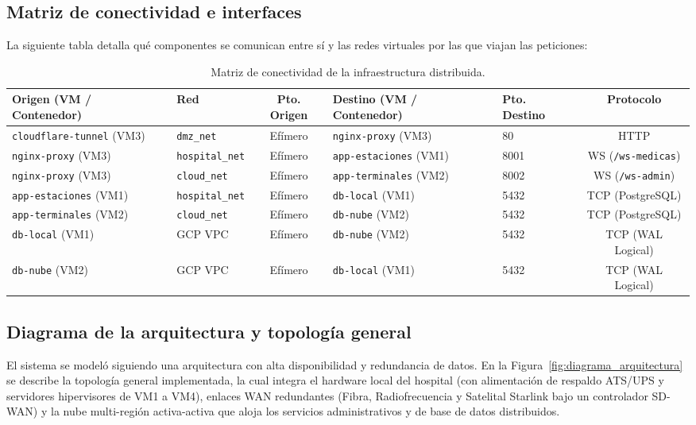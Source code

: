 \documentclass[11pt,a4paper]{article}
\begin{document}
\subsection{Matriz de conectividad e interfaces}
La siguiente tabla detalla qué componentes se comunican entre sí y las redes virtuales por las que viajan las peticiones:

\begin{table}[h!]
\centering
\small
\begin{tabular}{llcllc}
\toprule
\textbf{Origen (VM / Contenedor)} & \textbf{Red} & \textbf{Pto. Origen} & \textbf{Destino (VM / Contenedor)} & \textbf{Pto. Destino} & \textbf{Protocolo} \\
\midrule
\texttt{cloudflare-tunnel} (VM3) & \texttt{dmz\_net} & Efímero & \texttt{nginx-proxy} (VM3) & 80 & HTTP \\
\texttt{nginx-proxy} (VM3) & \texttt{hospital\_net} & Efímero & \texttt{app-estaciones} (VM1) & 8001 & WS (\texttt{/ws-medicas}) \\
\texttt{nginx-proxy} (VM3) & \texttt{cloud\_net} & Efímero & \texttt{app-terminales} (VM2) & 8002 & WS (\texttt{/ws-admin}) \\
\texttt{app-estaciones} (VM1) & \texttt{hospital\_net} & Efímero & \texttt{db-local} (VM1) & 5432 & TCP (PostgreSQL) \\
\texttt{app-terminales} (VM2) & \texttt{cloud\_net} & Efímero & \texttt{db-nube} (VM2) & 5432 & TCP (PostgreSQL) \\
\texttt{db-local} (VM1) & GCP VPC & Efímero & \texttt{db-nube} (VM2) & 5432 & TCP (WAL Logical) \\
\texttt{db-nube} (VM2) & GCP VPC & Efímero & \texttt{db-local} (VM1) & 5432 & TCP (WAL Logical) \\
\bottomrule
\end{tabular}
\caption{Matriz de conectividad de la infraestructura distribuida.}
\label{tab:conectividad}
\end{table}

\subsection{Diagrama de la arquitectura y topología general}
El sistema se modeló siguiendo una arquitectura con alta disponibilidad y redundancia de datos. En la Figura~\ref{fig:diagrama_arquitectura} se describe la topología general implementada, la cual integra el hardware local del hospital (con alimentación de respaldo ATS/UPS y servidores hipervisores de VM1 a VM4), enlaces WAN redundantes (Fibra, Radiofrecuencia y Satelital Starlink bajo un controlador SD-WAN) y la nube multi-región activa-activa que aloja los servicios administrativos y de base de datos distribuidos.
\end{document}

